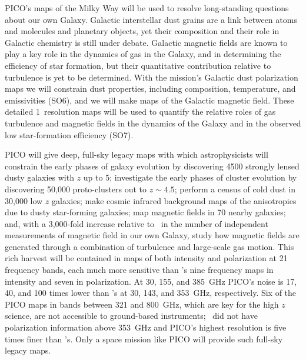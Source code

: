 \documentclass[PICOAPC.tex]{subfiles}
\begin{document}
PICO's maps of the Milky Way will be used to resolve long-standing questions about our own Galaxy. Galactic interstellar dust grains are a link between atoms and molecules and planetary objects, yet their composition and their role in Galactic chemistry is still under debate. Galactic magnetic fields are known to play a key role in the dynamics of gas in the Galaxy, and in determining the efficiency of star formation, but their quantitative contribution relative to turbulence is yet to be determined. With the mission's Galactic dust polarization maps we will constrain dust properties, including composition, temperature, and emissivities (SO6), and we will make maps of the Galactic magnetic field. These detailed 1\arcmin\ resolution maps will be used to quantify the relative roles of gas turbulence and magnetic fields in the dynamics of the Galaxy and in the observed low star-formation efficiency (SO7). 

PICO will give deep, full-sky legacy maps with which astrophysicists will constrain the early phases of galaxy evolution by discovering 4500 strongly lensed dusty galaxies with $z$ up to 5; investigate the early phases of cluster evolution by discovering 50,000 proto-clusters out to $z\sim4.5$; perform a census of cold dust in 30,000 low $z$ galaxies; make cosmic infrared background maps of the anisotropies due to dusty star-forming galaxies; map magnetic fields in 70 nearby galaxies; and, with a 3,000-fold increase relative to \planck\ in the number of independent measurements of magnetic field in our own Galaxy, study how magnetic fields are generated through a combination of turbulence and large-scale gas motion. This rich harvest will be contained in maps of both intensity and polarization at 21 frequency bands, each much more sensitive than \planck 's nine frequency maps in intensity and seven in polarization. At 30, 155, and 385~GHz PICO's noise is 17, 40, and 100 times lower than \planck 's at 30, 143, and 353~GHz, respectively. Six of the PICO maps in bands between 321 and 800~GHz, which are key for the high $z$ science, are not accessible to ground-based instruments; \planck\ did not have polarization information above 353~GHz and PICO's highest resolution is five times finer than \planck 's. Only a space mission like PICO will provide such full-sky legacy maps. 


\end{document}
